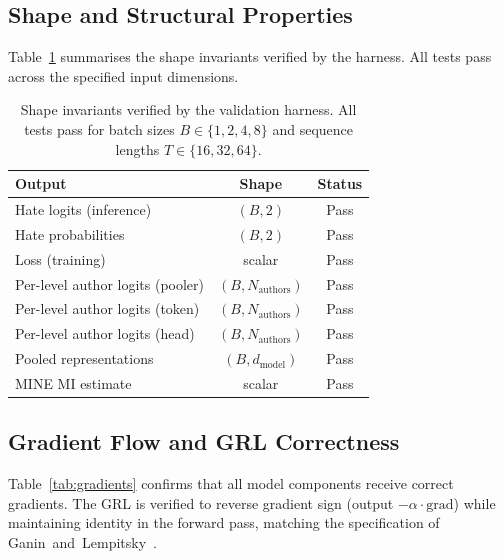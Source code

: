 \documentclass{article}
\begin{document}
\subsection{Shape and Structural Properties}

Table~\ref{tab:shapes} summarises the shape invariants verified by the
harness. All tests pass across the specified input dimensions.

\begin{table}[h]
  \centering
  \caption{Shape invariants verified by the validation harness.
           All tests pass for batch sizes $B\in\{1,2,4,8\}$ and
           sequence lengths $T\in\{16,32,64\}$.}
  \label{tab:shapes}
  \begin{tabular}{lcc}
    \toprule
    \textbf{Output} & \textbf{Shape} & \textbf{Status} \\
    \midrule
    Hate logits (inference) & $(B, 2)$ & Pass \\
    Hate probabilities & $(B, 2)$ & Pass \\
    Loss (training) & scalar & Pass \\
    Per-level author logits (pooler) & $(B, N_{\text{authors}})$ & Pass \\
    Per-level author logits (token) & $(B, N_{\text{authors}})$ & Pass \\
    Per-level author logits (head) & $(B, N_{\text{authors}})$ & Pass \\
    Pooled representations & $(B, d_{\text{model}})$ & Pass \\
    MINE MI estimate & scalar & Pass \\
    \bottomrule
  \end{tabular}
\end{table}

\subsection{Gradient Flow and GRL Correctness}

Table~\ref{tab:gradients} confirms that all model components receive
correct gradients. The GRL is verified to reverse gradient sign (output
$-\alpha \cdot \text{grad}$) while maintaining identity in the forward
pass, matching the specification of Ganin~and~Lempitsky~\cite{ganin2015unsupervised}.
\end{document}
